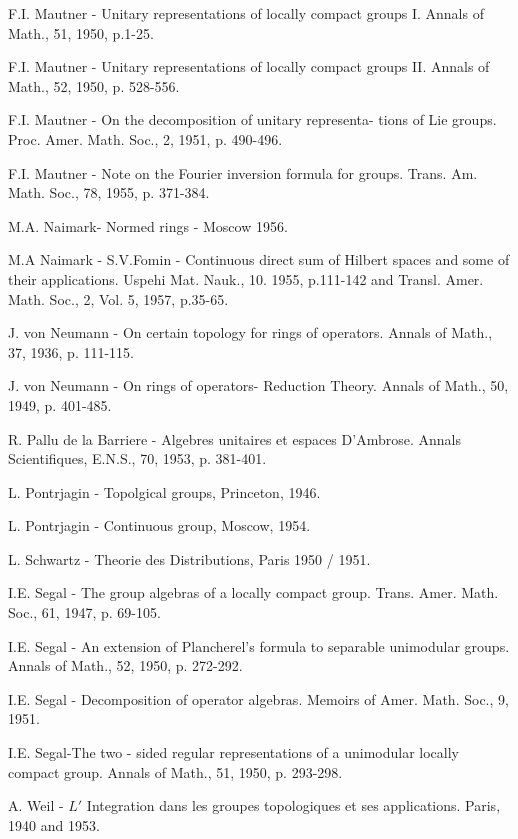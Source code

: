 \begin{thebibliography}{99}
  F.I. Mautner   -  Unitary representations of locally compact
   groups I.
   Annals of Math., 51, 1950, p.1-25.

 F.I. Mautner -  Unitary representations of locally compact
   groups II.
   Annals of Math., 52, 1950, p. 528-556.

 F.I. Mautner   -  On the decomposition of unitary representa-
   tions of Lie groups.
  Proc. Amer. Math. Soc., 2, 1951, p. 490-496.

 F.I. Mautner -  Note on the Fourier inversion formula for groups.
   Trans. Am. Math. Soc., 78, 1955, p. 371-384.

  M.A. Naimark\pageoriginale   -  Normed rings - Moscow 1956.

  M.A Naimark -  S.V.Fomin  -  Continuous direct sum of
  Hilbert spaces  and some of their applications. Uspehi Mat. Nauk.,
  10. 1955, p.111-142 and  Transl. Amer. Math. Soc., 2, Vol. 5,
   1957, p.35-65.

 {J. von Neumann} -  On certain topology for rings of operators.
   Annals of Math., 37, 1936, p. 111-115.

  J. von Neumann  -  On rings of operators- Reduction Theory.
   Annals of Math., 50, 1949, p. 401-485.

 {R. Pallu de la Barriere}  -  Algebres unitaires et
  espaces D'Ambrose. 
   Annals Scientifiques, E.N.S., 70, 1953, p. 381-401.

  {L. Pontrjagin} - Topolgical groups, Princeton, 1946.

  L. Pontrjagin  - Continuous group, Moscow, 1954.

  {L. Schwartz}  -  Theorie des Distributions, Paris 1950
  / 1951.

  {I.E. Segal} - The group algebras of a locally compact group.
   Trans. Amer. Math. Soc., 61, 1947, p. 69-105.

  I.E. Segal  - An extension of Plancherel's formula to
   separable unimodular groups.
   Annals of Math., 52, 1950, p. 272-292.

  I.E. Segal  -  Decomposition of operator algebras.
   Memoirs of Amer. Math. Soc., 9, 1951.

 {I.E. Segal}-\pageoriginale The two - sided regular
  representations of 
    a unimodular locally compact group.
    Annals of Math., 51, 1950, p. 293-298.

  {A. Weil} - $L'$ Integration dans les groupes
    topologiques et ses applications.
    Paris, 1940 and 1953.
\end{thebibliography}
